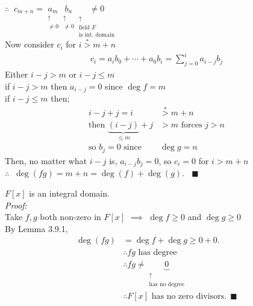 \begin{lemma}
    $\therefore \ $ $c_{m+n}=\underset{\substack{\uparrow \\ \neq 0}}{a_m}\underset{\substack{\uparrow \\ \neq 0}}{b_n} \underset{\substack{\uparrow \ \ \\ \text{field }F \\ \text{is int. domain}}}{\neq 0} $ \\
    Now consider $c_i$ for $i\overset{*}{>}m+n$ 
    \begin{align}
        c_i = a_ib_0 + \cdots + a_0b_i = \sum_{j=0}^i a_{i-j}b_j \nonumber
    \end{align}
    Either $i-j>m$ or $i-j \leq m$ \\
    \noindent if $i-j>m$ then $a_{i-j}=0$ since $\deg f = m$ \\
    \noindent if $i-j \leq m$ then;
    \begin{align}
        i-j + j = i &\overset{*}{>} m + n \nonumber \\
        \text{then } \underbrace{(i-j)}_{\leq m} +j &> m  \text{ forces }j>n \nonumber \\
        \text{so }b_j = 0 \text{ since } &\deg g = n  \nonumber
    \end{align}
    Then, no matter what $i-j$ is, $a_{i-j}b_j=0$, so $c_i=0$ for $i>m+n$ \\ \steezybreak
    $\therefore \ $ $\deg (fg) = m + n = \deg(f)+\deg(g). \ \ \ \ \blacksquare$
\end{lemma}
\setcounter{dummy_lemma}{0}
\begin{corollary}
    $F[x]$ is an integral domain. \\ \steezybreak
    \textit{Proof:} \\ \steezybreak
    Take $f,g$ both non-zero in $F[x]$ $ \implies $ $\deg f\geq 0$ and $\deg g \geq 0$ \\ 
    By Lemma 3.9.1,
    \begin{align}
        \deg(fg)&=\deg f +\deg g \geq 0 + 0. \nonumber \\
        &\therefore fg \text{ has degree} \nonumber \\
        & \therefore fg \neq \underbrace{0}_{\substack{\uparrow \\ \text{has no degree}}} \nonumber \\
        & \therefore F[x] \text{ has no zero divisors.} \ \ \blacksquare \nonumber
    \end{align}
\end{corollary}

